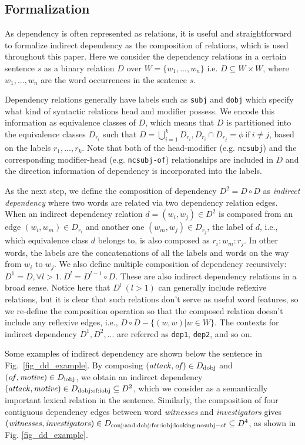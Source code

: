 \documentclass[english]{jnlp_1.4}
\begin{document}
\subsection{Formalization}

As dependency is often represented as relations, it is useful and
straightforward to formalize indirect dependency as the composition of
relations, which is used throughout this paper. Here we consider the
dependency relations in a certain sentence $s$ as a binary relation
$D$ over $W = \{w_1, ..., w_n\}$ i.e. $D \subseteq W \times W$, where
$w_1,...,w_n$ are the word occurrences in the sentence $s$. 

Dependency relations generally have labels such as \verb|subj| and
\verb|dobj| which specify what kind of syntactic relations head and
modifier possess. We encode this information as equivalence classes of
$D$, which means that $D$ is partitioned into the equivalence classes
$D_{r_i}$ such that $D = \bigcup_{i=1}^k D_{r_i}, D_{r_i} \cap D_{r_j}
= \phi\ \mathrm{if}\ i \neq j$, based on the labels $r_1, ...,
r_k$. Note that both of the head-modifier (e.g. \verb|ncsubj|) and the
corresponding modifier-head (e.g. \verb|ncsubj-of|) relationships are
included in $D$ and the direction information of dependency is
incorporated into the labels.


As the next step, we define the composition of dependency $D^2 = D
\circ D$ as {\em indirect dependency} where two words are related via
two dependency relation edges. When an indirect dependency relation $d
= (w_i, w_j) \in D^2$ is composed from an edge $(w_i, w_m) \in
D_{r_i}$ and another one $(w_m, w_j) \in D_{r_j}$, the label of $d$,
i.e., which equivalence class $d$ belongs to, is also composed as
$r_i:w_m:r_j$. In other words, the labels are the concatenations of
all the labels and words on the way from $w_i$ to $w_j$. We also
define multiple composition of dependency recursively: $D^1 = D,
\forall l > 1.\ D^l = D^{l-1} \circ D$. These are also indirect
dependency relations in a broad sense. Notice here that $D^l\ (l > 1)$
can generally include reflexive relations, but it is clear that such
relations don't serve as useful word features, so we re-define the
composition operation so that the composed relation doesn't include
any reflexive edges, i.e., $D \circ D - \{(w, w) | w \in W\}$. The
contexts for indirect dependency $D^1, D^2, ...$ are referred as
\verb|dep1|, \verb|dep2|, and so on.

Some examples of indirect dependency are shown below the sentence in
Fig.~\ref{fig_dd_example}. By composing $({\it attack}, {\it of}) \in
D_{\rm dobj}$ and $({\it of}, {\it motive}) \in D_{\rm iobj}$, we
obtain an indirect dependency $({\it attack}, {\it motive}) \in D_{\rm
  dobj:of:iobj} \subseteq D^2$, which we consider as a semantically
important lexical relation in the sentence. Similarly, the composition
of four contiguous dependency edges between word {\em witnesses} and
{\em investigators} gives $({\it witnesses}, {\it investigators}) \in
D_{\rm conj:and:dobj:for:iobj:looking:ncsubj-of} \subseteq D^4$, as shown in
Fig. \ref{fig_dd_example}.
\end{document}
